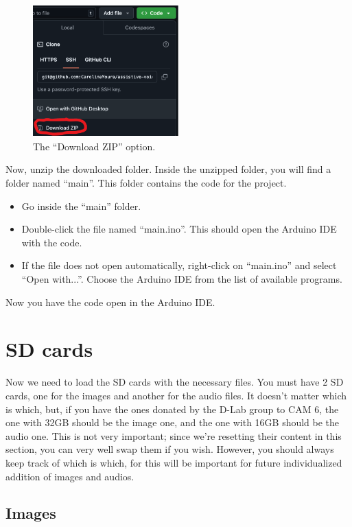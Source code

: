 \documentclass{article}
\begin{document}
\begin{figure}[h]
\centering
\includegraphics[width=0.5\textwidth]{../images/download_zip.png}
\caption{The ``Download ZIP'' option.}
\end{figure}

Now, unzip the downloaded folder. Inside the unzipped folder, you will find a folder named ``main''. This folder contains the code for the project.

\begin{itemize}
    \item Go inside the ``main'' folder.
    \item Double-click the file named ``main.ino''. This should open the Arduino IDE with the code.
    \item If the file does not open automatically, right-click on ``main.ino'' and select ``Open with...''. Choose the Arduino IDE from the list of available programs.
\end{itemize}

Now you have the code open in the Arduino IDE.

\section{SD cards}
Now we need to load the SD cards with the necessary files. You must have 2 SD cards, one for the images and another for the audio files. It doesn't matter which is which, but, if you have the ones donated by the D-Lab group to CAM 6, the one with 32GB should be the image one, and the one with 16GB should be the audio one. This is not very important; since we're resetting their content in this section, you can very well swap them if you wish. However, you should always keep track of which is which, for this will be important for future individualized addition of images and audios.

\subsection{Images}
\end{document}
